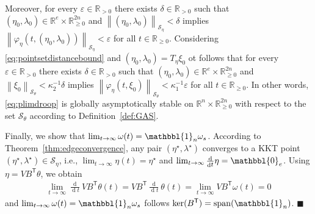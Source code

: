 \documentclass[twocolumn,twoside,journal]{IEEEtran}
\DeclareMathOperator{\diff}{d}
\DeclareMathOperator{\vspan}{span}
\newcommand{\mc}{\mathcal}
\newcommand{\ddt}{\tfrac{\diff}{\diff \!t}}
\newcommand{\norm}[1]{\left \lVert #1 \right \rVert}
\newcommand\red[1]{{\color{red}#1}}
\begin{document}
Moreover, for every $\varepsilon \in \mathbb{R}_{>0}$ there exists $\delta \in \mathbb{R}_{>0}$ such that $(\eta_0,\lambda_0) \in \mathbb{R}^{e} \times \mathbb{R}^{2n}_{\geq0}$ and $\norm{(\eta_0,\lambda_0)}_{\mc S_\eta} < \delta$ implies $\norm{\varphi_\eta(t,(\eta_0,\lambda_0))}_{\mc S_\eta} < \varepsilon$ for all $t \in \mathbb{R}_{\geq 0}$. Considering \eqref{eq:pointsetdistancebound} and $(\eta_0,\lambda_0) = T_\eta \xi_0$ ot follows that for every $\varepsilon \in \mathbb{R}_{>0}$ there exists $\delta \in \mathbb{R}_{>0}$ such that $(\eta_0,\lambda_0) \in \mathbb{R}^{e} \times \mathbb{R}^{2n}_{\geq0}$ and $\norm{\xi_0}_{\mc S_\theta} < \kappa_2^{-1}\delta$ implies $\norm{\varphi_\eta(t,\xi_0)}_{\mc S_\theta} < \kappa_1^{-1} \varepsilon$ for all $t \in \mathbb{R}_{\geq 0}$. In other words, \eqref{eq:plimdroop} is globally asymptotically stable on $\mathbb{R}^n \times \mathbb{R}^{2n}_{\geq 0}$ with respect to the set  $\mathcal{S}_{\theta}$ according to Definition~\ref{def:GAS}.
%

Finally, we show that $\lim_{t \to \infty} \omega(t) = \mathbbl{1}_n \omega_{s}$. According to Theorem~\ref{thm:edgeconvergence}, any pair $\left(\eta^\star, \lambda^\star\right)$ converges to a KKT point $\left(\eta^\star, \lambda^\star \right) \in \mc S_\eta$, i.e., $\lim_{t \to \infty} \eta(t) = \eta^\star$ and $\lim_{t \to \infty} \ddt \eta=\mathbbl{0}_e$. Using $\eta = V B^\mathsf{T} \theta$, we obtain
\begin{align*}
   \lim_{t \to \infty} \ddt V B^\mathsf{T} \theta(t) =  V B^\mathsf{T}  \ddt \theta(t) = \lim_{t \to \infty} VB^\mathsf{T} \omega(t) = 0
\end{align*}
and $\lim_{t \to \infty} \omega(t) = \mathbbl{1}_n \omega_{s}$ follows $\ker(B^\mathsf{T})=\vspan(\mathbbl{1}_n)$.
\hfill $\blacksquare$
\end{document}
